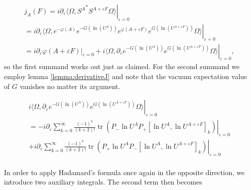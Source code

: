 \documentclass[b5paper,draft,openbib,12pt]{memoir}
\DeclareMathOperator{\tr}{tr}
\begin{document}
\begin{multline}\label{sleek_current_calc1}
j_A(F) = i \partial_{\varepsilon}\left. \langle \Omega, {S^{A} }^* S^{A+\varepsilon F}\Omega \rangle \right|_{\varepsilon=0}\\
=i \partial_{\varepsilon}\left. \langle \Omega, e^{-\varphi(A)} e^{-G(\ln (U^A))} 
e^{\varphi(A+\varepsilon F)}  e^{G(\ln (U^{A+\varepsilon F}))} \Omega\rangle \right|_{\varepsilon=0}\\
=i \partial_{\varepsilon} \left. \varphi(A+\varepsilon F) \right|_{\varepsilon=0}
+i\langle \Omega,\partial_{\varepsilon}\left.  e^{-G(\ln (U^A))} 
e^{G(\ln (U^{A+\varepsilon F}))} \Omega\rangle \right|_{\varepsilon=0},
\end{multline}
so the first summand works out just as claimed. For the second summand we employ lemma \ref{lemma:derivativeJ} and note that the vacuum expectation value of \(G\) vanishes no matter its argument.

\begin{multline}\label{sleek_current_calc3}
i\langle \Omega,\partial_{\varepsilon}\left.  e^{-G(\ln (U^A))} 
e^{G(\ln (U^{A+\varepsilon F}))} \Omega\rangle \right|_{\varepsilon=0}\\
=-i  \partial_{\varepsilon} \left.\sum_{k=0}^\infty \frac{(-1)^k}{(k+2)!} 
 \tr\left(P_- \ln U^A P_+[\ln U^A ,\ln U^{A+\varepsilon F} ]_{k}\right) \right|_{\varepsilon=0}\\
 +i  \partial_{\varepsilon} \left.\sum_{k=0}^\infty \frac{(-1)^k}{(k+2)!}  \tr\left(P_+ \ln U^A P_-[\ln U^A,\ln U^{A+\varepsilon F} ]_{k}\right) \right|_{\varepsilon=0}\\ 
\end{multline}

In order to apply Hadamard's formula once again in the opposite direction, we introduce two auxiliary integrals.
The second term then becomes
\end{document}

